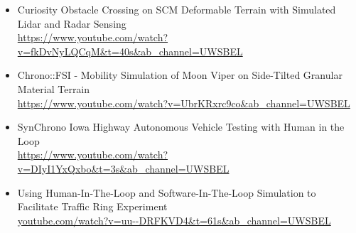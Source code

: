 



\begin{footnotesize}

\begin{itemize}[leftmargin=2ex, nosep, noitemsep]
	
	
	\item {Curiosity Obstacle Crossing on SCM Deformable Terrain with Simulated Lidar and Radar Sensing \\ \url{https://www.youtube.com/watch?v=fkDvNyLQCqM&t=40s&ab_channel=UWSBEL}}
	
	
	\item {Chrono::FSI - Mobility Simulation of Moon Viper on Side-Tilted Granular Material Terrain \\ \url{https://www.youtube.com/watch?v=UbrKRxrc9co&ab_channel=UWSBEL}}
	
	
	
	
	\item {SynChrono Iowa Highway Autonomous Vehicle Testing with Human in the Loop \\ \url{https://www.youtube.com/watch?v=DIyI1YxQxbo&t=3s&ab_channel=UWSBEL}}
	
	
	\item {Using Human-In-The-Loop and Software-In-The-Loop Simulation to Facilitate Traffic Ring Experiment \\ \url{youtube.com/watch?v=uu--DRFKVD4&t=61s&ab_channel=UWSBEL}}

\end{itemize}
	
\end{footnotesize}


